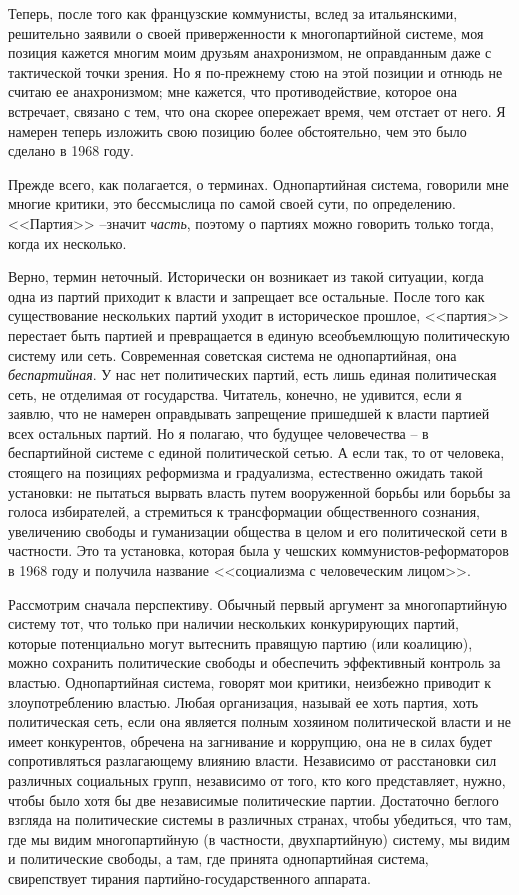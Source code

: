 \documentclass{book}
\begin{document}
Теперь, после того как французские коммунисты, вслед за итальянскими, решительно заявили о своей приверженности к многопартийной системе, моя позиция кажется многим моим друзьям анахронизмом, не оправданным даже с тактической точки зрения. Но я по-прежнему стою на этой позиции и отнюдь не считаю ее анахронизмом; мне кажется, что противодействие, которое она встречает, связано с тем, что она скорее опережает время, чем отстает от него. Я намерен теперь изложить свою позицию более обстоятельно, чем это было сделано в 1968 году.

Прежде всего, как полагается, о терминах. Однопартийная система, говорили мне многие критики, это бессмыслица по са­мой своей сути, по определению. <<Партия>> --значит \textit{часть},  по­этому о партиях можно говорить только тогда, когда их не­сколько.

Верно, термин неточный. Исторически он возникает из такой ситуации, когда одна из партий приходит к власти и запрещает все остальные. После того как существование нескольких пар­тий уходит в историческое прошлое, <<партия>> перестает быть партией и превращается в единую всеобъемлющую политиче­скую систему или сеть. Современная советская система не одно­партийная, она \textit{беспартийная}.  У нас нет политических партий, есть лишь единая политическая сеть, не отделимая от государ­ства. Читатель, конечно, не удивится, если я заявлю, что не наме­рен оправдывать запрещение пришедшей к власти партией всех остальных партий. Но я полагаю, что будущее человечества -- в беспартийной системе с единой политической сетью. А если так, то от человека, стоящего на позициях реформизма и градуализма, естественно ожидать такой установки: не пытаться вырвать власть путем вооруженной борьбы или борьбы за го­лоса избирателей, а стремиться к трансформации общественно­го сознания, увеличению свободы и гуманизации общества в целом и его 
политической сети в частности. Это та установка, которая была у чешских коммунистов-реформаторов в 1968 го­ду и получила название <<социализма с человеческим лицом>>.

Рассмотрим сначала перспективу. Обычный первый аргумент за многопартийную систему тот, что только при наличии не­скольких конкурирующих партий, которые потенциально мо­гут вытеснить правящую партию (или коалицию), можно со­хранить политические свободы и обеспечить эффективный контроль за властью. Однопартийная система, говорят мои кри­тики, неизбежно приводит к злоупотреблению властью. Любая организация, называй ее хоть партия, хоть политическая сеть, если она является полным хозяином политической власти и не имеет конкурентов, обречена на загнивание и коррупцию, она не в силах будет сопротивляться разлагающему влиянию власти. Независимо от расстановки сил различных социальных групп, независимо от того, кто кого представляет, нужно, что­бы было хотя бы две независимые политические партии. До­статочно беглого взгляда на политические системы в различных странах, чтобы убедиться, что там, где мы видим многопартий­ную (в частности, двухпартийную) систему, мы видим и поли­тические свободы, а там, где принята 
однопартийная система, свирепствует тирания партийно-государственного аппарата.
\end{document}
